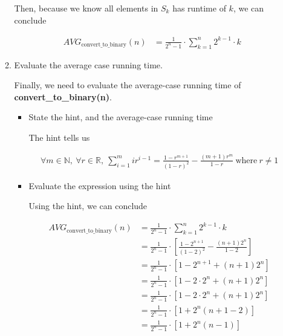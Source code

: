 \documentclass[12pt]{article}
\begin{document}
\begin{enumerate}[a.]
\begin{mdframed}
\begin{enumerate}[1.]
\begin{mdframed}
            \bigskip

            Then, because we know all elements in $S_k$ has runtime of $k$,
            we can conclude

            \begin{align}
                AVG_{\text{convert\_to\_binary}}(n) &= \frac{1}{2^n - 1} \cdot \sum\limits_{k = 1}^n 2^{k-1} \cdot k
            \end{align}

        \end{mdframed}

        \item Evaluate the average case running time.

        \bigskip

        Finally, we need to evaluate the average-case running time of
        \textbf{convert\_to\_binary(n)}.

        \bigskip

        \begin{itemize}
            \item State the hint, and the average-case running time

            \begin{mdframed}

            The hint tells us

            \begin{align}
                \forall m \in \mathbb{N},\:\forall r \in \mathbb{R},\:\sum\limits_{i=1}^m ir^{i-1} = \frac{1 - r^{m+1}}{(1-r)^2} - \frac{(m+1)r^m}{1-r}\:\text{where}\:r \neq 1
            \end{align}

            \end{mdframed}

            \item Evaluate the expression using the hint

            \begin{mdframed}

            Using the hint, we can conclude

            \begin{align}
                AVG_{\text{convert\_to\_binary}}(n) &= \frac{1}{2^n - 1} \cdot \sum\limits_{k = 1}^n 2^{k-1} \cdot k\\
                &= \frac{1}{2^n - 1} \cdot \left[ \frac{1 - 2^{n+1}}{(1-2)^2} - \frac{(n+1)2^n}{1-2} \right]\\
                &= \frac{1}{2^n - 1} \cdot \left[ 1 - 2^{n+1} + (n+1)2^n \right]\\
                &= \frac{1}{2^n - 1} \cdot \left[ 1 - 2 \cdot 2^n + (n+1)2^n \right]\\
                &= \frac{1}{2^n - 1} \cdot \left[ 1 - 2 \cdot 2^n + (n+1)2^n \right]\\
                &= \frac{1}{2^n - 1} \cdot \left[ 1 + 2^n(n+1 - 2) \right]\\
                &= \frac{1}{2^n - 1} \cdot \left[ 1 + 2^n(n-1) \right]
            \end{align}


\end{mdframed}
\end{itemize}
\end{enumerate}
\end{mdframed}
\end{enumerate}
\end{document}
